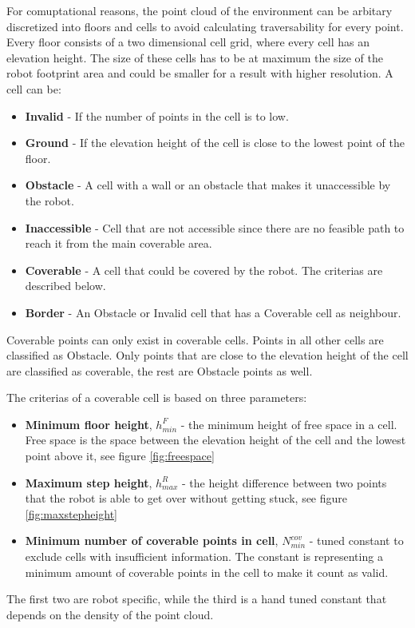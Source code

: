 For comuptational reasons, the point cloud of the environment can be arbitary discretized into floors and cells to avoid calculating traversability for every point. Every floor consists of a two dimensional cell grid, where every cell has an elevation height. The size of these cells has to be at maximum the size of the robot footprint area and could be smaller for a result with higher resolution. A cell can be:

\begin{itemize}
    \item \textbf{Invalid} - If the number of points in the cell is to low.
    \item \textbf{Ground} - If the elevation height of the cell is close to the lowest point of the floor.
    \item \textbf{Obstacle} - A cell with a wall or an obstacle that makes it unaccessible by the robot.
    \item \textbf{Inaccessible} - Cell that are not accessible since there are no feasible path to reach it from the main coverable area. 
    \item \textbf{Coverable} - A cell that could be covered by the robot. The criterias are described below.
    \item \textbf{Border} - An Obstacle or Invalid cell that has a Coverable cell as neighbour. 
\end{itemize}


Coverable points can only exist in coverable cells. Points in all other cells are classified as Obstacle. Only points that are close to the elevation height of the cell are classified as coverable, the rest are Obstacle points as well.

The criterias of a coverable cell is based on three parameters:
\begin{itemize}
    \item \textbf{Minimum floor height}, $h^{F}_{min}$  - the minimum height of free space in a cell. Free space is the space between the elevation height of the cell and the lowest point above it, see figure \ref{fig:freespace}
    \item \textbf{Maximum step height}, $h^{R}_{max}$ - the height difference between two points that the robot is able to get over without getting stuck, see figure \ref{fig:maxstepheight}
    \item \textbf{Minimum number of coverable points in cell}, $N^{cov}_{min}$ - tuned constant to exclude cells with insufficient information. The constant is representing a minimum amount of coverable points in the cell to make it count as valid.
\end{itemize}
The first two are robot specific, while the third is a hand tuned constant that depends on the density of the point cloud. 

